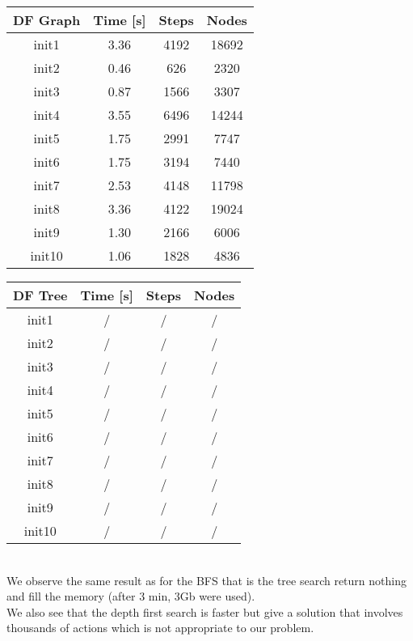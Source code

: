\documentclass[a4paper,10pt]{article}
\begin{document}
	\begin{tabular}{|c||c|c|c|}
		\hline 
		\textbf{DF Graph} & \textbf{Time [s]} & \textbf{Steps} & \textbf{Nodes} \\ 
		\hline 
		init1 & 3.36 & 4192 & 18692 \\ 
		\hline 
		init2 & 0.46 & 626 & 2320 \\ 
		\hline 
		init3 & 0.87 & 1566 & 3307 \\ 
		\hline 
		init4 & 3.55 & 6496 & 14244 \\ 
		\hline 
		init5 & 1.75 & 2991 & 7747 \\ 
		\hline 
		init6 & 1.75 & 3194 & 7440 \\ 
		\hline 
		init7 & 2.53 & 4148 & 11798 \\ 
		\hline 
		init8 & 3.36 & 4122 & 19024 \\ 
		\hline 
		init9 & 1.30 & 2166 & 6006 \\ 
		\hline 
		init10 & 1.06 & 1828 & 4836 \\ 
		\hline 
	\end{tabular} 
	\hspace{0.5cm}
	\begin{tabular}{|c||c|c|c|}
		\hline 
		\textbf{DF Tree} & \textbf{Time [s]} & \textbf{Steps} & \textbf{Nodes} \\ 
		\hline 
		init1 & / & / & / \\ 
		\hline 
		init2 & / & / & / \\ 
		\hline 
		init3 & / & / & / \\ 
		\hline 
		init4 & / & / & / \\ 
		\hline 
		init5 & / & / & / \\ 
		\hline 
		init6 & / & / & / \\ 
		\hline 
		init7 & / & / & / \\ 
		\hline 
		init8 & / & / & / \\ 
		\hline 
		init9 & / & / & / \\ 
		\hline 
		init10 & / & / & / \\ 
		\hline 
	\end{tabular}
	\vspace{0.5cm}\\
	We observe the same result as for the BFS that is the tree search return nothing and fill the memory (after 3 min, 3Gb were used).\\
	We also see that the depth first search is faster but give a solution that involves thousands of actions which is not appropriate to our problem.
\end{document}
